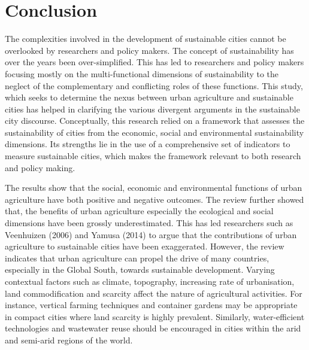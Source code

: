 \chapter{Conclusion} %

\label{Chapter:Conclusion}

The complexities involved in the development of sustainable cities cannot be overlooked by researchers and policy makers. The concept of sustainability has over the years been over-simplified. This has led to researchers and policy makers focusing mostly on the multi-functional dimensions of sustainability to the neglect of the complementary and conflicting roles of these functions. This study, which seeks to determine the nexus between urban agriculture and sustainable cities has helped in clarifying the various divergent arguments in the sustainable city discourse. Conceptually, this research relied on a framework that assesses the sustainability of cities from the economic, social and environmental sustainability dimensions. Its strengths lie in the use of a comprehensive set of indicators to measure sustainable cities, which makes the framework relevant to both research and policy making.

The results show that the social, economic and environmental functions of urban agriculture have both positive and negative outcomes. The review further showed that, the benefits of urban agriculture especially the ecological and social dimensions have been grossly underestimated. This has led researchers such as Veenhuizen (2006) and Yamusa (2014) to argue that the contributions of urban agriculture to sustainable cities have been exaggerated. However, the review indicates that urban agriculture can propel the drive of many countries, especially in the Global South, towards sustainable development. Varying contextual factors such as climate, topography, increasing rate of urbanisation, land commodification and scarcity affect the nature of agricultural activities. For instance, vertical farming techniques and container gardens may be appropriate in compact cities where land scarcity is highly prevalent. Similarly, water-efficient technologies and wastewater reuse should be encouraged in cities within the arid and semi-arid regions of the world.

